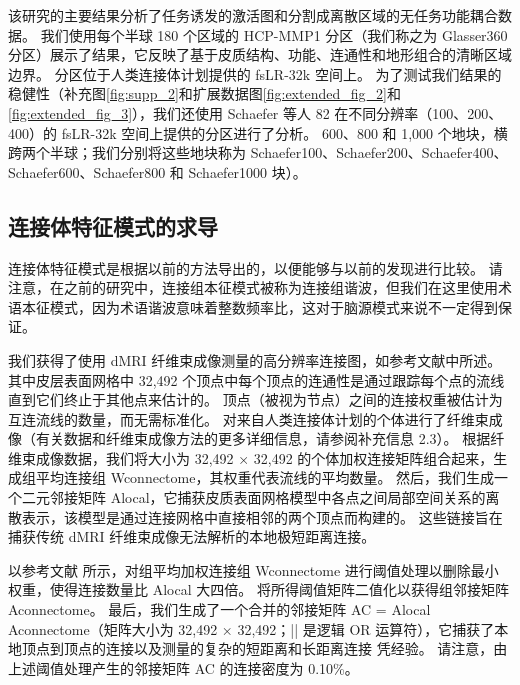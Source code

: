 \documentclass[lang=cn,a4paper,newtx]{elegantpaper}
\begin{document}
该研究的主要结果分析了任务诱发的激活图和分割成离散区域的无任务功能耦合数据。
我们使用每个半球 180 个区域的 HCP-MMP1 分区（我们称之为 Glasser360 分区）展示了结果，它反映了基于皮质结构、功能、连通性和地形组合的清晰区域边界\cite{glasser2016multi}。
分区位于人类连接体计划提供的 fsLR-32k 空间上。
为了测试我们结果的稳健性（补充图\ref{fig:supp_2}和扩展数据图\ref{fig:extended_fig_2}和\ref{fig:extended_fig_3}），我们还使用 Schaefer 等人 82 在不同分辨率（100、200、400）的 fsLR-32k 空间上提供的分区进行了分析。
600、800 和 1,000 个地块，横跨两个半球；我们分别将这些地块称为 Schaefer100、Schaefer200、Schaefer400、Schaefer600、Schaefer800 和 Schaefer1000 块）。


\subsection{连接体特征模式的求导} \label{sec:connectome_derivation}

连接体特征模式是根据以前的方法\cite{naze2021robustness}导出的，以便能够与以前的发现进行比较。
请注意，在之前的研究中\cite{atasoy2016human,preti2019decoupling,naze2021robustness,rue2021connectome}，连接组本征模式被称为连接组谐波，但我们在这里使用术语本征模式，因为术语谐波意味着整数频率比，这对于脑源模式来说不一定得到保证。


我们获得了使用 dMRI 纤维束成像测量的高分辨率连接图，如参考文献\cite{tian2021high}中所述。
其中皮层表面网格中 32,492 个顶点中每个顶点的连通性是通过跟踪每个点的流线直到它们终止于其他点来估计的。
顶点（被视为节点）之间的连接权重被估计为互连流线的数量，而无需标准化\cite{tournier2019mrtrix3}。
对来自人类连接体计划的个体进行了纤维束成像（有关数据和纤维束成像方法的更多详细信息，请参阅补充信息 2.3）。 
根据纤维束成像数据，我们将大小为 32,492 × 32,492 的个体加权连接矩阵组合起来，生成组平均连接组 Wconnectome，其权重代表流线的平均数量。
然后，我们生成一个二元邻接矩阵 Alocal，它捕获皮质表面网格模型中各点之间局部空间关系的离散表示，该模型是通过连接网格中直接相邻的两个顶点而构建的。
这些链接旨在捕获传统 dMRI 纤维束成像无法解析的本地极短距离连接。


以参考文献\cite{naze2021robustness} 所示，对组平均加权连接组 Wconnectome 进行阈值处理以删除最小权重，使得连接数量比 Alocal 大四倍。
将所得阈值矩阵二值化以获得组邻接矩阵 Aconnectome。 
最后，我们生成了一个合并的邻接矩阵 AC = Alocal Aconnectome（矩阵大小为 32,492 × 32,492；|| 是逻辑 OR 运算符），它捕获了本地顶点到顶点的连接以及测量的复杂的短距离和长距离连接 凭经验。
请注意，由上述阈值处理产生的邻接矩阵 AC 的连接密度为 0.10\%。
\end{document}
